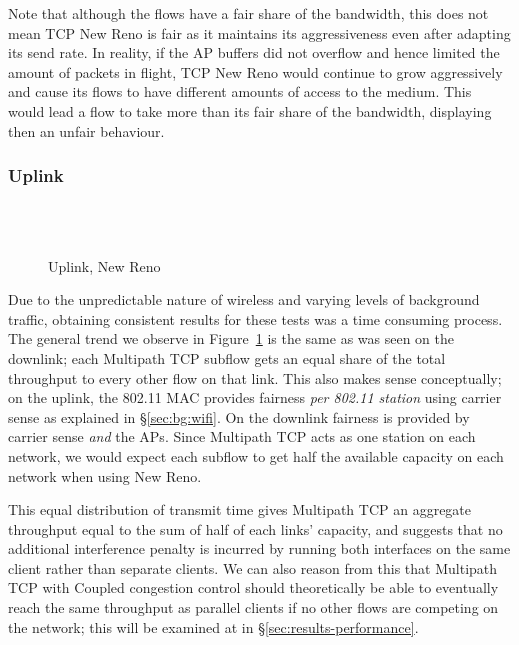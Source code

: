 Note that although the flows have a fair share of the bandwidth, this does not 
mean TCP New Reno is fair as it maintains its aggressiveness even after adapting 
its send rate. In reality, if the AP buffers did not overflow and hence limited 
the amount of packets in flight, TCP New Reno would continue to grow 
aggressively and cause its flows to have different amounts of access to the 
medium. This would lead a flow to take more than its fair share of the 
bandwidth, displaying then an unfair behaviour.  

\subsubsection{Uplink}
\label{sec:results-mptcp-up}

\begin{figure}[h]
  \centering
  \\
  \subfloat[][2.4 GHz, non-overlapping channels] {\
    \scalebox{0.70}{}\label{graph:cc-reno-up}
  }
  \\
  \subfloat[][5 and 2.4 GHz] {\
    \scalebox{0.70}{}\label{graph:cb-reno-up}
  }
  \caption{Uplink, New Reno}\label{graph:reno-up}
\end{figure}

Due to the unpredictable nature of wireless and varying levels of background
traffic, obtaining consistent results for these tests was a time consuming
process. The general trend we observe in Figure~\ref{graph:reno-up} is the
same as was seen on the downlink; each Multipath TCP subflow gets an equal
share of the total throughput to every other flow on that link. This also makes
sense conceptually; on the uplink, the 802.11 MAC provides fairness
\emph{per 802.11 station} using carrier sense as explained in
\S\ref{sec:bg:wifi}. On the downlink fairness is provided by carrier sense
\emph{and} the APs. Since Multipath TCP acts as one station on each network,
we would expect each subflow to get half the available capacity on each network
when using New Reno.

This equal distribution of transmit time gives Multipath TCP an aggregate throughput equal
to the sum of half of each links' capacity, and suggests that no additional interference
penalty is incurred by running both interfaces on the same client rather than
separate clients. We can also reason from this that Multipath TCP with Coupled
congestion control should theoretically be able to eventually reach the same
throughput as parallel clients if no other flows are competing on the network; 
this will be examined at in \S\ref{sec:results-performance}.


